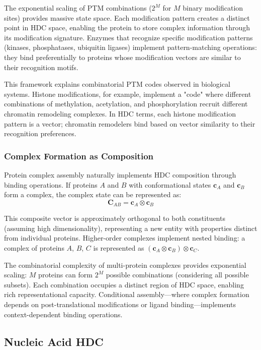\documentclass[12pt]{article}
\begin{document}
The exponential scaling of PTM combinations ($2^M$ for $M$ binary modification sites) provides massive state space. Each modification pattern creates a distinct point in HDC space, enabling the protein to store complex information through its modification signature. Enzymes that recognize specific modification patterns (kinases, phosphatases, ubiquitin ligases) implement pattern-matching operations: they bind preferentially to proteins whose modification vectors are similar to their recognition motifs.

This framework explains combinatorial PTM codes observed in biological systems. Histone modifications, for example, implement a "code" where different combinations of methylation, acetylation, and phosphorylation recruit different chromatin remodeling complexes. In HDC terms, each histone modification pattern is a vector; chromatin remodelers bind based on vector similarity to their recognition preferences.

\subsubsection{Complex Formation as Composition}

Protein complex assembly naturally implements HDC composition through binding operations. If proteins $A$ and $B$ with conformational states $\mathbf{c}_A$ and $\mathbf{c}_B$ form a complex, the complex state can be represented as:
\begin{equation}
\mathbf{C}_{AB} = \mathbf{c}_A \otimes \mathbf{c}_B
\end{equation}

This composite vector is approximately orthogonal to both constituents (assuming high dimensionality), representing a new entity with properties distinct from individual proteins. Higher-order complexes implement nested binding: a complex of proteins $A$, $B$, $C$ is represented as $(\mathbf{c}_A \otimes \mathbf{c}_B) \otimes \mathbf{c}_C$.

The combinatorial complexity of multi-protein complexes provides exponential scaling: $M$ proteins can form $2^M$ possible combinations (considering all possible subsets). Each combination occupies a distinct region of HDC space, enabling rich representational capacity. Conditional assembly—where complex formation depends on post-translational modifications or ligand binding—implements context-dependent binding operations.

\subsection{Nucleic Acid HDC}
\end{document}
